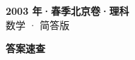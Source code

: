 \documentclass[zihao=-4, a4paper]{ctexart}
\begin{document}
\begin{center}
  {\Large\bfseries 2003 年·春季北京卷·理科}\\[4pt]
  {\large 数学 · 简答版}
\end{center}
\medskip
{}

\clearpage
{}
\begin{center}{\Large\bfseries 答案速查}\end{center}
\medskip

\end{document}
